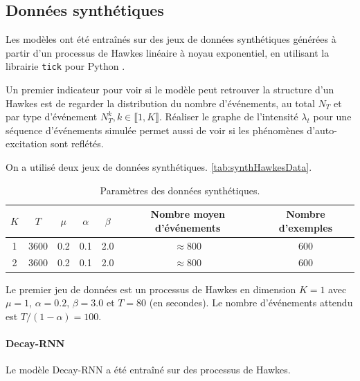 \documentclass[../main.tex]{subfiles}
\begin{document}
\subsection{Données synthétiques}\label{ssec:synthResults}

Les modèles ont été entraînés sur des jeux de données synthétiques générées à partir d'un processus de Hawkes linéaire à noyau exponentiel, en utilisant la librairie \verb|tick| pour Python \cite{2017arXiv170703003B}.

Un premier indicateur pour voir si le modèle peut retrouver la structure d'un Hawkes est de regarder la distribution du nombre d'événements, au total $N_T$ et par type d'événement $N^k_T, k\in\llbracket 1,K\rrbracket$. Réaliser le graphe de l'intensité $\lambda_t$ pour une séquence d'événements simulée permet aussi de voir si les phénomènes d'auto-excitation sont reflétés.

On a utilisé deux jeux de données synthétiques. \autoref{tab:synthHawkesData}.

\begin{table}[h]
	\centering
	\begin{tabular}[]{ccccccc}
		\toprule
		$K$ & $T$ & $\mu$ & $\alpha$ & $\beta$ & Nombre moyen d'événements & Nombre d'exemples\\ \hline\hline
		1 & 3600 & 0.2 & 0.1 & 2.0 & $\approx 800$ & 600 \\\hline
		2 & 3600 & 0.2 & 0.1 & 2.0 & $\approx 800$ & 600
	\end{tabular}
	\caption{Paramètres des données synthétiques.}\label{tab:synthHawkesData}
\end{table}

Le premier jeu de données est un processus de Hawkes en dimension $K=1$ avec $\mu=1$, $\alpha = \num{0.2}$, $\beta = \num{3.0}$ et $T = \num{80}$ (en secondes). Le nombre d'événements attendu est $T/(1-\alpha) = \num{100}$.

\paragraph{Decay-RNN} Le modèle Decay-RNN a été entraîné sur des processus de Hawkes.
\end{document}

